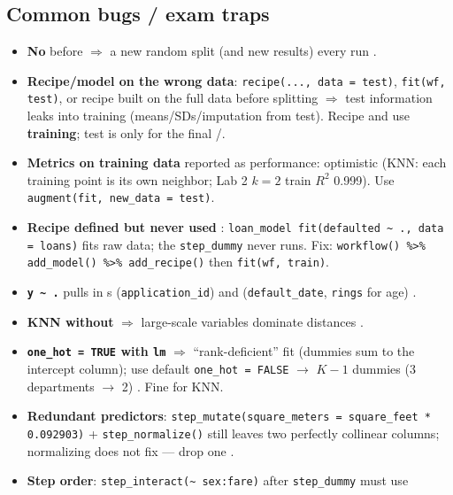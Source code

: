 \subsection{Common bugs / exam traps}
\begin{trap}
\begin{itemize}\setlength\itemsep{1pt}
\item \textbf{No } before  $\Rightarrow$ a new random split (and new results) every run .
\item \textbf{Recipe/model on the wrong data}: \texttt{recipe(..., data = test)}, \texttt{fit(wf, test)}, or recipe built on the
  full data before splitting $\Rightarrow$ test information leaks into training (means/SDs/imputation from test).
  Recipe and  use \textbf{training}; test is only for the final /.
\item \textbf{Metrics on training data} reported as performance: optimistic (KNN: each training point is its own
  neighbor; Lab 2 $k=2$ train $R^2$ 0.999). Use \texttt{augment(fit, new\_data = test)}.
\item \textbf{Recipe defined but never used} : \texttt{loan\_model \npipe{} fit(defaulted \textasciitilde{} ., data = loans)} fits raw data;
  the \texttt{step\_dummy} never runs. Fix: \texttt{workflow() \%>\% add\_model() \%>\% add\_recipe()} then \texttt{fit(wf, train)}.
\item \textbf{\texttt{y \textasciitilde{} .}} pulls in s (\texttt{application\_id}) and  (\texttt{default\_date}, \texttt{rings} for age) .
\item \textbf{KNN without } $\Rightarrow$ large-scale variables dominate distances .
\item \textbf{\texttt{one\_hot = TRUE} with \texttt{lm}} $\Rightarrow$ ``rank-deficient'' fit (dummies sum to the intercept column);
  use default \texttt{one\_hot = FALSE} $\to$ $K-1$ dummies (3 departments $\to$ 2) . Fine for KNN.
\item \textbf{Redundant predictors}: \texttt{step\_mutate(square\_meters = square\_feet * 0.092903)} +
  \texttt{step\_normalize()} still leaves two perfectly collinear columns; normalizing does not fix
   --- drop one .
\item \textbf{Step order}: \texttt{step\_interact(\textasciitilde{} sex:fare)} after \texttt{step\_dummy} must use

\end{itemize}
\end{trap}
